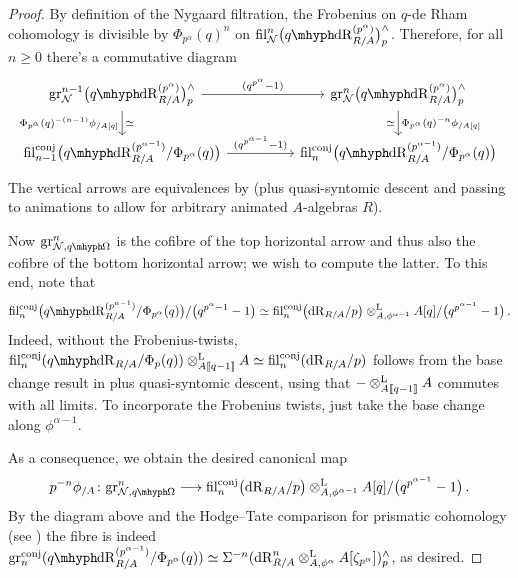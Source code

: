 \documentclass[DIV=12,numbers=enddot,leqno,bibliography=totoc]{scrartcl}
\begin{document}
	\begin{proof}
		By definition of the Nygaard filtration, the Frobenius on $q$-de Rham cohomology is divisible by $\Phi_{p^\alpha}(q)^n$ on $ \fil_\Nn^n\bigl(\qdeRham_{R/A}^{(p^\alpha)}\bigr)_p^\complete$. Therefore, for all $n\geqslant 0$ there's a commutative diagram
		\begin{equation*}
			\begin{tikzcd}[column sep=huge]
				\gr_\Nn^{n-1}\bigl(\qdeRham_{R/A}^{(p^\alpha)}\bigr)_p^\complete\rar["(q^{p^\alpha}-1)"]\dar["\Phi_{p^\alpha}(q)^{-(n-1)}\phi_{/A[q]}"',"\simeq"] & \gr_\Nn^n\bigl(\qdeRham_{R/A}^{(p^\alpha)}\bigr)_p^\complete\dar["\Phi_{p^\alpha}(q)^{-n}\phi_{/A[q]}","\simeq"']\\
				\fil_{n-1}^\mathrm{conj}\bigl(\qdeRham_{R/A}^{(p^{\alpha-1})}/\Phi_{p^\alpha}(q)\bigr)\rar["(q^{p^{\alpha-1}}-1)"] &  \fil_n^\mathrm{conj}\bigl(\qdeRham_{R/A}^{(p^{\alpha-1})}/\Phi_{p^\alpha}(q)\bigr)
			\end{tikzcd}
		\end{equation*}
		The vertical arrows are equivalences by \cite[Theorem~(2)]{Prismatic} (plus quasi-syntomic descent and passing to animations to allow for arbitrary animated $A$-algebras $R$).
		
		Now $\gr_{\Nn, \qOmega}^n$ is the cofibre of the top horizontal arrow and thus also the cofibre of the bottom horizontal arrow; we wish to compute the latter. To this end, note that
		\begin{equation*}
			\fil_n^\mathrm{conj}\bigl(\qdeRham_{R/A}^{(p^{\alpha-1})}/\Phi_{p^\alpha}(q)\bigr)/\bigl(q^{p^\alpha-1}-1\bigr)\simeq  \fil_n^\mathrm{conj}\bigl(\deRham_{R/A}/p\bigr)\lotimes_{A,\phi^{\alpha-1}}A[q]/\bigl(q^{p^{\alpha-1}}-1\bigr)\,.
		\end{equation*}
		Indeed, without the Frobenius-twists, $ \fil_n^\mathrm{conj}(\qdeRham_{R/A}/\Phi_p(q))\lotimes_{A\qpower}A\simeq  \fil_n^\mathrm{conj}(\deRham_{R/A}/p)$ follows from the base change result in \cite[Theorem~(3)]{Prismatic} plus quasi-syntomic descent, using that $-\otimes^{\mathrm{L}}_{A\llbracket q-1\rrbracket}A$ commutes with all limits. To incorporate the Frobenius twists, just take the base change along $\phi^{\alpha-1}$.
		
		As a consequence, we obtain the desired canonical map
		\begin{equation*}
			p^{-n}\phi_{/A}\colon \gr_{\Nn, \qOmega}^n\longrightarrow  \fil_n^\mathrm{conj}\bigl(\deRham_{R/A}/p\bigr)\lotimes_{A,\phi^{\alpha-1}}A[q]/\bigl(q^{p^{\alpha-1}}-1\bigr)\,.
		\end{equation*}
		By the diagram above and the Hodge--Tate comparison for prismatic cohomology (see \cite[Construction~]{Prismatic}) the fibre is indeed $\gr_n^\mathrm{conj}(\qdeRham_{R/A}^{(p^{\alpha-1})}/\Phi_{p^\alpha}(q))\simeq \Sigma^{-n}(\deRham_{R/A}^n\lotimes_{A,\phi^\alpha}A[\zeta_{p^\alpha}])_p^\complete$, as desired. 
	\end{proof}
\end{document}
